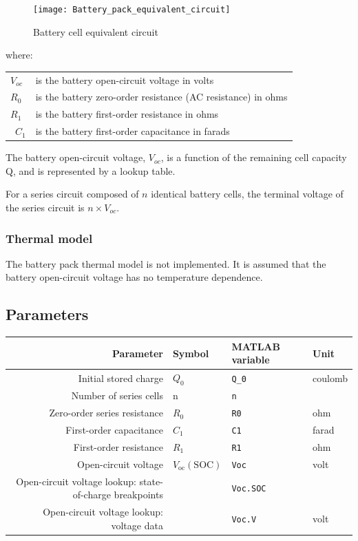 \documentclass[../SimBALink.tex]{subfiles}
\begin{document}
		\begin{figure}[h!]
				\centering
				\texttt{[image: Battery\_pack\_equivalent\_circuit]}
				\caption{Battery cell equivalent circuit}
				\label{fig:battery_pack_equivalent_circuit}
		\end{figure}
		\FloatBarrier
		
		where:
		\begin{center}
		\begin{tabular}{l l}
			$V_{oc}$		&	is the battery open-circuit voltage in volts	\\
			$R_{0}$		&	is the battery zero-order resistance (AC resistance) in ohms \\
			$R_{1}$		& 	is the battery first-order resistance in ohms \\\
			$C_{1}$		&	is the battery first-order capacitance in farads \\
		\end{tabular}
		\end{center}
		
		The battery open-circuit voltage, $V_{oc}$, is a function of the remaining cell capacity Q, and is represented by a lookup table.
		
		For a series circuit composed of $n$ identical battery cells, the terminal voltage of the series circuit is $n \times V_{oc}$.
		
	\subsubsection{Thermal model}
		The battery pack thermal model is not implemented. It is assumed that the battery open-circuit voltage has no temperature dependence.
		

\subsection{Parameters}
	\begin{tabular}{ r | l | l | l }
		Parameter				&	Symbol				&	MATLAB variable	&	Unit						\\	\hline	
		Initial stored charge			&	$Q_0$				&	\texttt{Q\_0}		&	coulomb					\\
		Number of series cells		&	n					&	\texttt{n}			&							\\
		Zero-order series resistance	&	$R_0$				&	\texttt{R0}			&	ohm						\\
		First-order capacitance		&	$C_1$				&	\texttt{C1}			&	farad					\\
		First-order resistance		&	$R_1$				&	\texttt{R1}			&	ohm						\\
		Open-circuit voltage			&	$V_\text{oc}(\text{SOC})$&	\texttt{Voc}		&	volt						\\
		Open-circuit voltage lookup: state-of-charge breakpoints	&		&	\texttt{Voc.SOC}	&							\\
		Open-circuit voltage lookup: voltage data	&			&	\texttt{Voc.V}		& 	volt
	\end{tabular}
\end{document}
